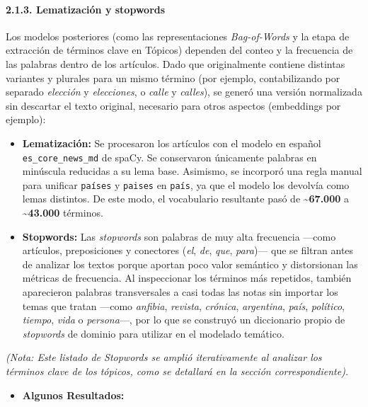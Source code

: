 \documentclass[
]{article}
\providecommand{\tightlist}{%
  \setlength{\itemsep}{0pt}\setlength{\parskip}{0pt}}
\begin{document}
\paragraph{2.1.3. Lematización y
stopwords}\label{lematizaciuxf3n-y-stopwords}

Los modelos posteriores (como las representaciones \emph{Bag-of-Words} y
la etapa de extracción de términos clave en Tópicos) dependen del conteo
y la frecuencia de las palabras dentro de los artículos. Dado que
originalmente contiene distintas variantes y plurales para un mismo
término (por ejemplo, contabilizando por separado \emph{elección} y
\emph{elecciones}, o \emph{calle} y \emph{calles}), se generó una
versión normalizada sin descartar el texto original, necesario para
otros aspectos (embeddings por ejemplo):

\begin{itemize}
\item
  \textbf{Lematización:} Se procesaron los artículos con el modelo en
  español \texttt{es\_core\_news\_md} de spaCy. Se conservaron
  únicamente palabras en minúscula reducidas a su lema base. Asimismo,
  se incorporó una regla manual para unificar \texttt{países} y
  \texttt{paises} en \texttt{país}, ya que el modelo los devolvía como
  lemas distintos. De este modo, el vocabulario resultante pasó de
  \textbf{\textasciitilde67.000} a \textbf{\textasciitilde43.000}
  términos.
\item
  \textbf{Stopwords:} Las \emph{stopwords} son palabras de muy alta
  frecuencia ---como artículos, preposiciones y conectores (\emph{el},
  \emph{de}, \emph{que}, \emph{para})--- que se filtran antes de
  analizar los textos porque aportan poco valor semántico y distorsionan
  las métricas de frecuencia. Al inspeccionar los términos más
  repetidos, también aparecieron palabras transversales a casi todas las
  notas sin importar los temas que tratan ---como \emph{anfibia},
  \emph{revista}, \emph{crónica}, \emph{argentina}, \emph{país},
  \emph{político}, \emph{tiempo}, \emph{vida} o \emph{persona}---, por
  lo que se construyó un diccionario propio de \emph{stopwords} de
  dominio para utilizar en el modelado temático.
\end{itemize}

\emph{(Nota: Este listado de Stopwords se amplió iterativamente al
analizar los términos clave de los tópicos, como se detallará en la
sección correspondiente).}

\begin{itemize}
\tightlist
\item
  \textbf{Algunos Resultados:}
\end{itemize}
\end{document}
